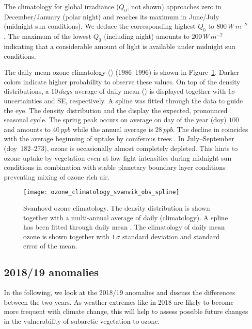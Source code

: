 \documentclass[bg, manuscript]{copernicus}
\begin{document}
The climatology for global irradiance ($Q_0$, not shown) approaches zero in December/January (polar night) and reaches its maximum in June/July (midnight sun conditions). We deduce the corresponding highest $Q_0$ to $800\,\unit{W\,m^{-2}}$. The maximum of the lowest $Q_0$ (including night) amounts to $200\,\unit{W\,m^{-2}}$ indicating that a considerable amount of light is available under midnight sun conditions.

The daily mean ozone climatology (\chem{\left<[O_3]\right>}) (1986--1996) is shown in Figure~\ref{fig:ozone_climatology_fenoscandic_obs_spline}. Darker colors indicate higher probability to observe these values. On top of the density distributions, a $10\,\unit{days}$ average of daily mean () is displayed together with $1 \sigma$ uncertainties and SE, respectively. A spline was fitted through the data to guide the eye. The \chem{[O_3]} density distribution and the  display the expected, pronounced seasonal cycle. The spring peak occurs on average on day of the year (\unit{doy}) $100$ and amounts to $40\,\unit{ppb}$ while the annual average \chem{\left<[O_3]\right>} is $28\,\unit{ppb}$. The decline in \chem{\left<[O_3]\right>} coincides with the average beginning of  uptake by coniferous trees \citep{TB:Kolari2007, TP:Wallin2013}. In July--September (\unit{doy}~182--273), ozone is occasionally almost completely depleted. This hints to ozone uptake by vegetation even at low light intensities during midnight sun conditions in combination with stable planetary boundary layer conditions preventing mixing of ozone rich air.

\begin{figure}[t]
  \texttt{[image: ozone\_climatology\_svanvik\_obs\_spline]}
  \caption{Svanhovd ozone climatology. The density distribution is shown together with a multi-annual average of daily \chem{[O_3]} (climatology). A spline has been fitted through daily mean \chem{[O_3]}. The climatology of daily mean ozone is shown together with $1\,\sigma$ standard deviation and standard error of the mean.}
  \label{fig:ozone_climatology_fenoscandic_obs_spline}
\end{figure}

\subsection{2018/19 anomalies}
\label{subsec:anomalies}
In the following, we look at the 2018/19 anomalies and discuss the differences between the two years. As weather extremes like in 2018 are likely to become more frequent with climate change, this will help to assess possible future changes in the vulnerability of subarctic vegetation to ozone.\\ 
\end{document}
